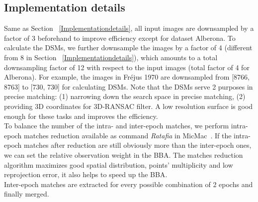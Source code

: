 
\subsection{Implementation details}
Same as Section ~\ref{Implementationdetails}, all input images are downsampled by a factor of 3 beforehand to improve efficiency except for dataset Alberona. To calculate the \ac{DSM}s, we further downsample the images by a factor of 4 (different from 8 in Section ~\ref{Implementationdetails}), which amounts to a total downsampling factor of 12 with respect to the input images (total factor of 4 for Alberona). For example, the images in Fr{\'e}jus 1970 are downsampled from [8766, 8763] to [730, 730] for calculating \ac{DSM}s. 
Note that the \ac{DSM}s serve 2 purposes in precise matching: (1) narrowing down the search space in precise matching, (2) providing 3D coordinates for 3D-RANSAC filter. A low resolution surface is good enough for these tasks and improves the efficiency.\\
To balance the number of the intra- and inter-epoch matches, we perform intra-epoch matches reduction available as command \textit{Ratafia} in MicMac~\cite{marc2016micmac}. %
If the intra-epoch matches after reduction are still obviously more than the inter-epoch ones, we can set the relative observation weight in the \ac{BBA}. The matches reduction algorithm maximizes good spatial distribution, points' multiplicity and low reprojection error, it also helps to speed up the \ac{BBA}.\\
Inter-epoch matches are extracted {for every possible combination of 2 epochs and finally merged}.\\

